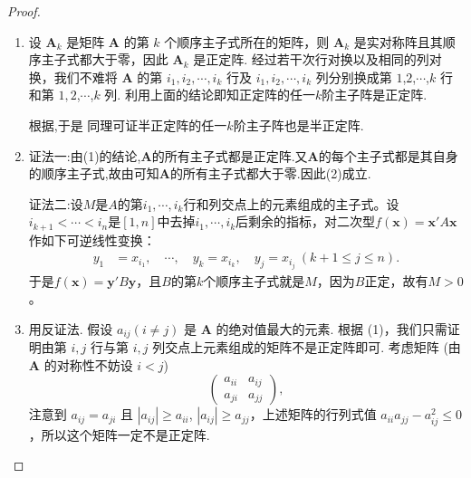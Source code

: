 \documentclass[../../main.tex]{subfiles}
\begin{document}
\begin{proof}
\begin{enumerate}[(1)]
\item 设 $\boldsymbol{A}_k$ 是矩阵 $\boldsymbol{A}$ 的第 $k$ 个顺序主子式所在的矩阵，则 $\boldsymbol{A}_k$ 是实对称阵且其顺序主子式都大于零，因此 $\boldsymbol{A}_k$ 是正定阵.
经过若干次行对换以及相同的列对换，我们不难将 $\boldsymbol{A}$ 的第 $i_1,i_2,\cdots,i_k$ 行及 $i_1,i_2,\cdots,i_k$ 列分别换成第 $1$,$2$,$\cdots$,$k$ 行和第 $1,2$,$\cdots$,$k$ 列. 利用上面的结论即知正定阵的任一$k$阶主子阵是正定阵.

根据,于是
同理可证半正定阵的任一$k$阶主子阵也是半正定阵.

\item {\color{blue}证法一:}由(1)的结论,$\boldsymbol{A}$的所有主子式都是正定阵.又$\boldsymbol{A}$的每个主子式都是其自身的顺序主子式,故由可知$\boldsymbol{A}$的所有主子式都大于零.因此(2)成立.

{\color{blue}证法二:}设\(M\)是\(A\)的第\(i_1,\cdots,i_k\)行和列交点上的元素组成的主子式。设\(i_{k + 1}<\cdots < i_n\)是\([1,n]\)中去掉\(i_1,\cdots,i_k\)后剩余的指标，对二次型\(f(\boldsymbol{x})=\boldsymbol{x}'A\boldsymbol{x}\)作如下可逆线性变换：
\begin{align*}
y_1&=x_{i_1},\quad\cdots,\quad y_k = x_{i_k},\quad y_j = x_{i_j}\ (k + 1\leqslant  j\leqslant  n).
\end{align*}
于是\(f(\boldsymbol{x})=\boldsymbol{y}'B\boldsymbol{y}\)，且\(B\)的第\(k\)个顺序主子式就是\(M\)，因为\(B\)正定，故有\(M > 0\)。

\item 用反证法. 假设 $a_{ij}(i\neq j)$ 是 $\boldsymbol{A}$ 的绝对值最大的元素. 根据 (1)，我们只需证明由第 $i,j$ 行与第 $i,j$ 列交点上元素组成的矩阵不是正定阵即可. 考虑矩阵 (由 $\boldsymbol{A}$ 的对称性不妨设 $i < j$)
\[
\begin{pmatrix}
a_{ii} & a_{ij}\\
a_{ji} & a_{jj}
\end{pmatrix},
\]
注意到 $a_{ij} = a_{ji}$ 且 $|a_{ij}|\geqslant  a_{ii}$, $|a_{ij}|\geqslant  a_{jj}$，上述矩阵的行列式值 $a_{ii}a_{jj}-a_{ij}^2\leqslant  0$，所以这个矩阵一定不是正定阵. 
\end{enumerate}

\end{proof}
\end{document}
